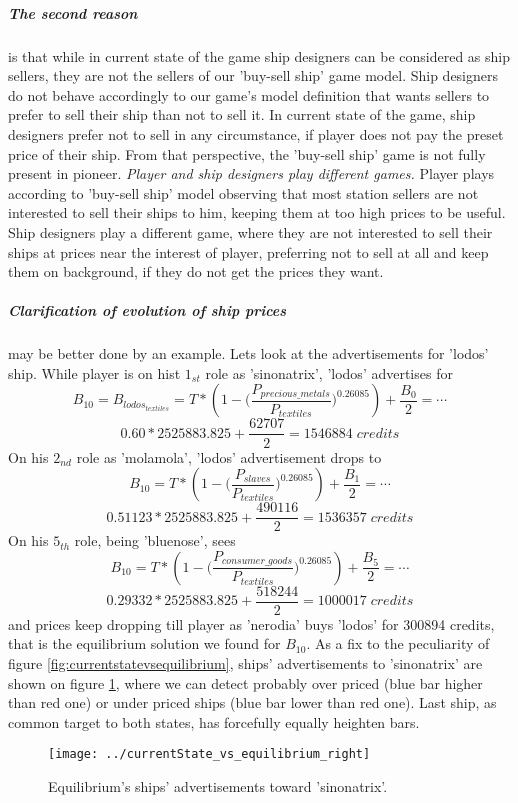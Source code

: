 \documentclass[]{article}
\begin{document}
\subparagraph*{The second reason} is that while in current state of the game ship designers can be considered as ship sellers, they are not the sellers of our 'buy-sell ship' game model. Ship designers do not behave accordingly to our game's model definition that wants sellers to prefer to sell their ship than not to sell it. In current state of the game, ship designers prefer not to sell in any circumstance, if player does not pay the preset price of their ship. From that perspective, the 'buy-sell ship' game is not fully present in pioneer. \emph{Player and ship designers play different games.} Player plays according to 'buy-sell ship' model observing that most station sellers are not interested to sell their ships to him, keeping them at too high prices to be useful. Ship designers play a different game, where they are not interested to sell their ships at prices near the interest of player, preferring not to sell at all and keep them on background, if they do not get the prices they want.

\subparagraph{Clarification of evolution of ship prices} may be better done by an example. Lets look at the advertisements for 'lodos' ship. While player is on hist $1_{st}$ role as 'sinonatrix', 'lodos' advertises for
\[	B_{10}=B_{lodos_{textiles}}=T*(1-\Big(\dfrac{P_{precious\_metals}}{P_{textiles}}\Big)^{0.26085})+\dfrac{B_{0}}{2}=\cdots\]
\[0.60*2525883.825+\dfrac{62707}{2}=1546884\;credits\]
 On his $2_{nd}$ role as 'molamola', 'lodos' advertisement drops to 
 \[	B_{10}=T*(1-\Big(\dfrac{P_{slaves}}{P_{textiles}}\Big)^{0.26085})+\dfrac{B_{1}}{2}=\cdots\]
 \[0.51123*2525883.825+\dfrac{490116}{2}=1536357\;credits\]
 On his $5_{th}$ role, being 'bluenose', sees
 \[	B_{10}=T*(1-\Big(\dfrac{P_{consumer\_goods}}{P_{textiles}}\Big)^{0.26085})+\dfrac{B_{5}}{2}=\cdots\]
\[0.29332*2525883.825+\dfrac{518244}{2}=1000017\;credits\]
and prices keep dropping till player as 'nerodia' buys 'lodos' for 300894 credits, that is the equilibrium solution we found for $B_{10}$.
As a fix to the peculiarity of figure \ref{fig:currentstatevsequilibrium}, ships' advertisements to 'sinonatrix' are shown on figure \ref{fig:currentstatevsequilibriumright}, where we can detect probably over priced (blue bar higher than red one) or under priced ships (blue bar lower than red one). Last ship, as common target to both states, has forcefully equally heighten bars. 
\begin{figure}[h]
	\centering
	\texttt{[image: ../currentState\_vs\_equilibrium\_right]}
	\caption{Equilibrium's ships' advertisements toward 'sinonatrix'.}
	\label{fig:currentstatevsequilibriumright}
\end{figure}
\end{document}
